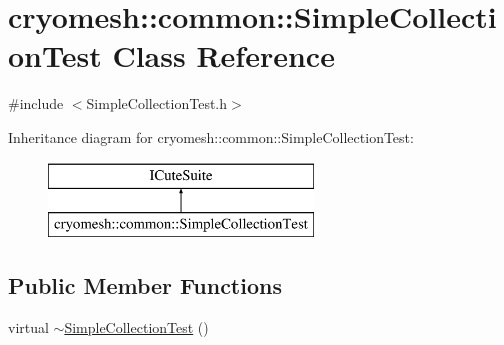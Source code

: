 \hypertarget{classcryomesh_1_1common_1_1_simple_collection_test}{
\section{cryomesh::common::SimpleCollectionTest Class Reference}
\label{classcryomesh_1_1common_1_1_simple_collection_test}
}


{\ttfamily \#include $<$SimpleCollectionTest.h$>$}

Inheritance diagram for cryomesh::common::SimpleCollectionTest:\begin{figure}[H]
\begin{center}
\leavevmode
\includegraphics[height=2.000000cm]{classcryomesh_1_1common_1_1_simple_collection_test}
\end{center}
\end{figure}
\subsection*{Public Member Functions}
\begin{DoxyCompactItemize}
\item 
virtual \hyperlink{classcryomesh_1_1common_1_1_simple_collection_test_abb9151f771142f0f40f92e2c57bb99f0}{$\sim$SimpleCollectionTest} ()
\end{DoxyCompactItemize}
